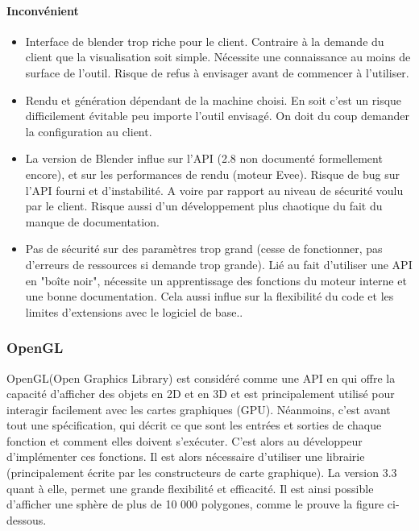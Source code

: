 \documentclass[a4paper]{article}
\begin{document}
\paragraph{Inconvénient}

    \begin{itemize}
                \item {Interface de blender trop riche pour le client.}
                Contraire à la demande du client que la visualisation soit simple. Nécessite une connaissance au moins de surface de l'outil. Risque de refus à envisager avant de commencer à l'utiliser.
                
                \item {Rendu et génération dépendant de la machine choisi.}
                En soit c'est un risque difficilement évitable peu importe l'outil envisagé. On doit du coup demander la configuration au client.
                
                \item {La version de Blender influe sur l'API (2.8 non documenté formellement encore), et sur les performances de rendu (moteur Evee).}
                Risque de bug sur l'API fourni et d'instabilité. A voire par rapport au niveau de sécurité voulu par le client. Risque aussi d'un développement plus chaotique du fait du manque de documentation.
                
                \item {Pas de sécurité sur des paramètres trop grand (cesse de fonctionner, pas d'erreurs de ressources si demande trop grande).}
                Lié au fait d'utiliser une API en "boîte noir", nécessite un apprentissage des fonctions du moteur interne et une bonne documentation. Cela aussi influe sur la flexibilité du code et les limites d'extensions avec le logiciel de base..
                
    \end{itemize}

\subsubsection{OpenGL}
OpenGL(Open Graphics Library) est considéré comme une API en  qui offre la capacité d'afficher des objets en 2D et en 3D et est principalement utilisé pour interagir facilement avec les cartes graphiques (GPU). Néanmoins, c'est avant tout une spécification, qui décrit ce que sont les entrées et sorties de chaque fonction et comment elles doivent s'exécuter. C'est alors au développeur d'implémenter ces fonctions. Il est alors nécessaire d'utiliser une librairie (principalement écrite par les constructeurs de carte graphique). La version 3.3 quant à elle, permet une grande flexibilité et efficacité. Il est ainsi possible d'afficher une sphère de plus de 10 000 polygones, comme le prouve la figure ci-dessous.
\end{document}
